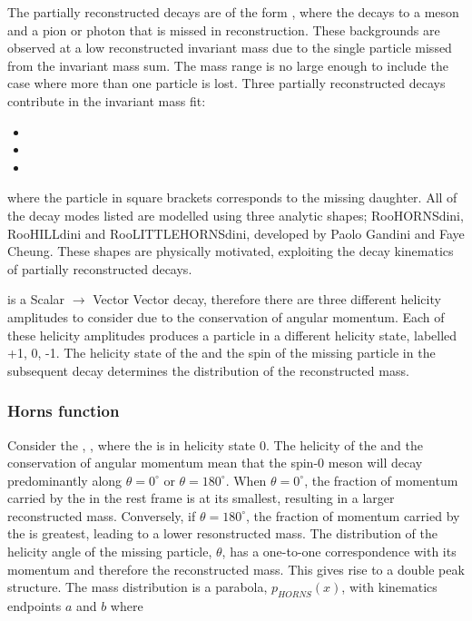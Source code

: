 The partially reconstructed decays are of the form \decay{\B}{\Dstar\Kstar}, where the \Dstar decays to a \D meson and a pion or photon that is missed in reconstruction. These backgrounds are observed at a low reconstructed invariant mass due to the single particle missed from the invariant mass sum. The \B mass range is no large enough to include the case where more than one particle is lost. Three partially reconstructed decays contribute in the invariant mass fit:

\begin{itemize}
\item{\decay{\Bm}{(\decay{\Dstarz}{\Dz[\piz]})\Kstarm}}
\item{\decay{\Bm}{(\decay{\Dstarz}{\Dz[\gamma]})\Kstarm}}
\item{\decay{\Bd}{(\decay{\Dstarp}{\Dz[\pip]})\Kstarm}}
\end{itemize}

where the particle in square brackets corresponds to the missing daughter. All of the decay modes listed are modelled using three analytic shapes; RooHORNSdini, RooHILLdini and RooLITTLEHORNSdini, developed by Paolo Gandini and Faye Cheung. These shapes are physically motivated, exploiting the decay kinematics of partially reconstructed decays.

\decay{\B}{\Dstar\Kstar} is a Scalar $\to$ Vector Vector decay, therefore there are three different helicity amplitudes to consider due to the conservation of angular momentum. Each of these helicity amplitudes produces a \Dstar particle in a different helicity state, labelled +1, 0, -1. The helicity state of the \Dstar and the spin of the missing particle in the subsequent \Dstar decay determines the distribution of the reconstructed \B mass. 

\subsubsection{Horns function}

Consider the \decay{\Bm}{\Dstarz\Kstarm}, \decay{\Dstarz}{\Dz\piz}, where the \Dstarz is in helicity state 0. The helicity of the \Dstarz and the conservation of angular momentum mean that the spin-0 \piz meson will decay predominantly along $\theta = 0^{\circ}$ or $\theta = 180^{\circ}$. When $\theta = 0^{\circ}$, the fraction of momentum carried by the \piz in the \B rest frame is at its smallest, resulting in a larger reconstructed \B mass. Conversely, if $\theta = 180^{\circ}$, the fraction of momentum carried by the \piz is greatest, leading to a lower resonstructed \B mass. The distribution of the helicity angle of the missing particle, $\theta$, has a one-to-one correspondence with its momentum and therefore the reconstructed \B mass. This gives rise to a double peak structure. The \B mass distribution is a parabola, $p_{HORNS}(x)$, with kinematics endpoints $a$ and $b$ where

